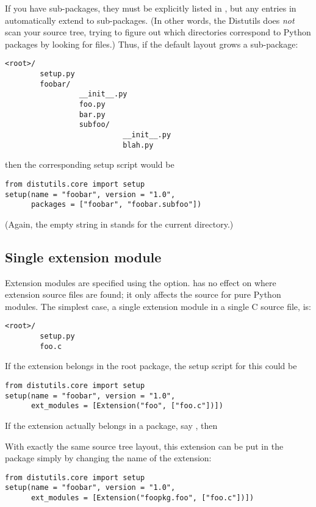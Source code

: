 \documentclass{howto}
\begin{document}
If you have sub-packages, they must be explicitly listed in
, but any entries in 
automatically extend to sub-packages.  (In other words, the Distutils
does \emph{not} scan your source tree, trying to figure out which
directories correspond to Python packages by looking for
 files.)  Thus, if the default layout grows a
sub-package:
\begin{verbatim}
<root>/
        setup.py
        foobar/
                 __init__.py
                 foo.py
                 bar.py
                 subfoo/
                           __init__.py
                           blah.py
\end{verbatim}
then the corresponding setup script would be
\begin{verbatim}
from distutils.core import setup
setup(name = "foobar", version = "1.0",
      packages = ["foobar", "foobar.subfoo"])
\end{verbatim}
(Again, the empty string in  stands for the current
directory.)


\subsection{Single extension module}
\label{single-ext}

Extension modules are specified using the  option.
 has no effect on where extension source files are
found; it only affects the source for pure Python modules.  The simplest 
case, a single extension module in a single C source file, is:
\begin{verbatim}
<root>/
        setup.py
        foo.c
\end{verbatim}
If the  extension belongs in the root package, the setup
script for this could be
\begin{verbatim}
from distutils.core import setup
setup(name = "foobar", version = "1.0",
      ext_modules = [Extension("foo", ["foo.c"])])
\end{verbatim}

If the extension actually belongs in a package, say ,
then 

With exactly the same source tree layout, this extension can be put in
the  package simply by changing the name of the
extension:
\begin{verbatim}
from distutils.core import setup
setup(name = "foobar", version = "1.0",
      ext_modules = [Extension("foopkg.foo", ["foo.c"])])
\end{verbatim}
\end{document}
